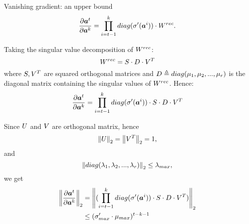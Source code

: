 \begin{frame}{Vanishing gradient: an upper bound}
	\begin{equation}
	\frac{\partial \boldsymbol{a}^t}{\partial \boldsymbol{a}^k} = \prod_{i=t-1}^{k}  diag(\sigma'(\boldsymbol{a}^i)) \cdot W^{rec}.
	\label{eq:temporalComponent}
	\end{equation}
	
	Taking the singular value decomposition of $W^{rec}$:
	\begin{equation}
	W^{rec} =  S\cdot D\cdot V^T
	\end{equation}
	where $S,V^T$ are squared orthogonal matrices and $D\triangleq diag(\mu_1, \mu_2,...,\mu_r)$ is the diagonal matrix containing the singular values of $W^{rec}$.
	Hence:
	\begin{equation}
	\frac{\partial \boldsymbol{a}^t}{\partial \boldsymbol{a}^k} = \prod_{i=t-1}^{k}  diag(\sigma'(\boldsymbol{a}^i)) \cdot S\cdot D \cdot V^T
	\end{equation}
\end{frame}
\begin{frame}
	Since $U$ and $V$ are orthogonal matrix, hence $$\left\Vert U \right\Vert_2=\left\Vert V^T \right\Vert_2 = 1,$$ and $$\left\Vert diag(\lambda_1, \lambda_2,...,\lambda_r) \right\Vert_2 \leq \lambda_{max},$$ we get
	\begin{align}
	\left\Vert \frac{\partial \boldsymbol{a}^t}{\partial \boldsymbol{a}^k} \right\Vert_2 &= \left\Vert  (\prod_{i=t-1}^{k} diag(\sigma'(\boldsymbol{a}^i)) \cdot S\cdot D \cdot V^T) \right\Vert_2\\
	&\leq (\sigma'_{max} \cdot \mu_{max})^{t-k-1}
	\end{align}
\end{frame}

